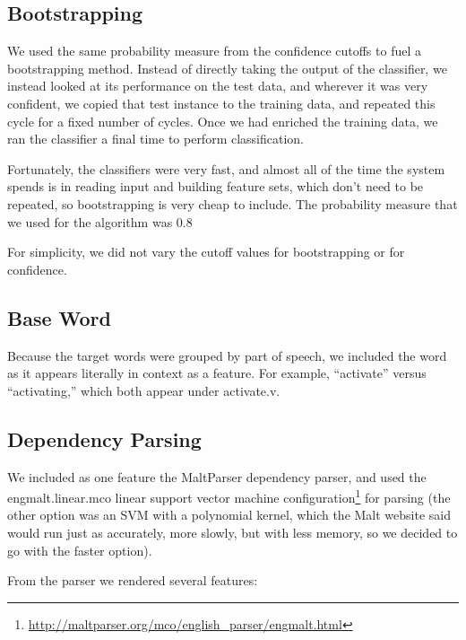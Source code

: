 \documentclass{article}
\begin{document}

\subsection{Bootstrapping}

We used the same probability measure from the confidence cutoffs to fuel a
bootstrapping method.  Instead of directly taking the output of the classifier,
we instead looked at its performance on the test data, and wherever it was very
confident, we copied that test instance to the training data, and repeated this
cycle for a fixed number of cycles.  Once we had enriched the training data, we
ran the classifier a final time to perform classification.

Fortunately, the classifiers were very fast, and almost all of the time the
system spends is in reading input and building feature sets, which don't need to
be repeated, so bootstrapping is very cheap to include.  The probability measure
that we used for the algorithm was 0.8

For simplicity, we did not vary the cutoff values for bootstrapping or for
confidence.

\subsection{Base Word}

Because the target words were grouped by part of speech, we included the word
as it appears literally in context as a feature.  For example, ``activate''
versus ``activating,'' which both appear under activate.v.

\subsection{Dependency Parsing}

We included as one feature the MaltParser dependency parser, and used the
engmalt.linear.mco linear support vector machine
configuration\footnote{\url{http://maltparser.org/mco/english_parser/engmalt.html}}
for parsing (the other option was an SVM with a polynomial kernel, which the
Malt website said would run just as accurately, more slowly, but with less
memory, so we decided to go with the faster option).

From the parser we rendered several features:
\end{document}
